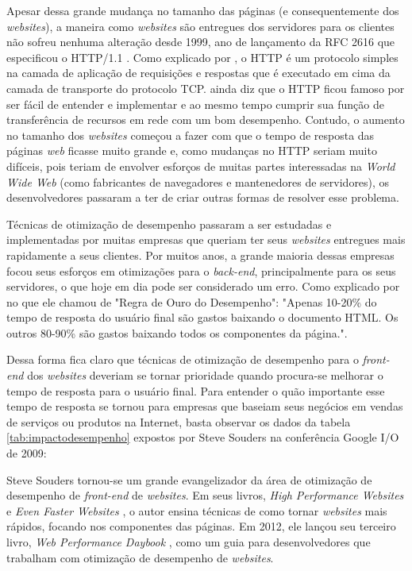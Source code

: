 Apesar dessa grande mudança no tamanho das páginas (e consequentemente dos \textit{websites}), a maneira como \textit{websites} são entregues dos servidores para os clientes não sofreu nenhuma alteração desde 1999, ano de lançamento da RFC 2616 que especificou o HTTP/1.1 \cite{RFC2616}. Como explicado por , o HTTP é um protocolo simples na camada de aplicação de requisições e respostas que é executado em cima da camada de transporte do protocolo TCP.  ainda diz que o HTTP ficou famoso por ser fácil de entender e implementar e ao mesmo tempo cumprir sua função de transferência de recursos em rede com um bom desempenho. Contudo, o aumento no tamanho dos \textit{websites} começou a fazer com que o tempo de resposta das páginas \textit{web} ficasse muito grande e, como mudanças no HTTP seriam muito difíceis, pois teriam de envolver esforços de muitas partes interessadas na \textit{World Wide Web} (como fabricantes de navegadores e mantenedores de servidores), os desenvolvedores passaram a ter de criar outras formas de resolver esse problema.

Técnicas de otimização de desempenho passaram a ser estudadas e implementadas por muitas empresas que queriam ter seus \textit{websites} entregues mais rapidamente a seus clientes. Por muitos anos, a grande maioria dessas empresas focou seus esforços em otimizações para o \textit{back-end}, principalmente para os seus servidores, o que hoje em dia pode ser considerado um erro. Como explicado por  no que ele chamou de "Regra de Ouro do Desempenho": "Apenas 10-20\% do tempo de resposta do usuário final são gastos baixando o documento HTML. Os outros 80-90\% são gastos baixando todos os componentes da página.".

Dessa forma fica claro que técnicas de otimização de desempenho para o \textit{front-end} dos \textit{websites} deveriam se tornar prioridade quando procura-se melhorar o tempo de resposta para o usuário final. Para entender o quão importante esse tempo de resposta se tornou para empresas que baseiam seus negócios em vendas de serviços ou produtos na Internet, basta observar os dados da tabela \autoref{tab:impactodesempenho} expostos por Steve Souders na conferência Google I/O de 2009:



Steve Souders tornou-se um grande evangelizador da área de otimização de desempenho de \textit{front-end} de \textit{websites}. Em seus livros, \textit{High Performance Websites} \cite{HighPerformance} e \textit{Even Faster Websites} \cite{EvenFaster}, o autor ensina técnicas de como tornar \textit{websites} mais rápidos, focando nos componentes das páginas. Em 2012, ele lançou seu terceiro livro, \textit{Web Performance Daybook} \cite{WebPerformance}, como um guia para desenvolvedores que trabalham com otimização de desempenho de \textit{websites}.

